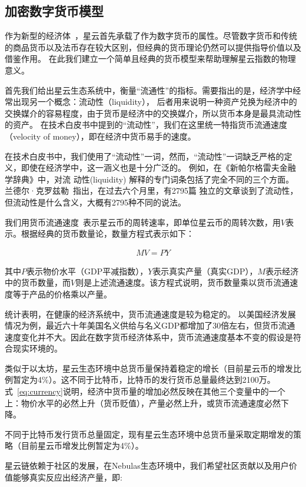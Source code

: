 \subsection{加密数字货币模型}

作为新型的经济体~\cite{neweco}，星云首先承载了作为数字货币的属性。尽管数字货币和传统的商品货币以及法币存在较大区别，但经典的货币理论仍然可以提供指导价值以及借鉴作用。
在此我们建立一个简单且经典的货币模型来帮助理解星云指数的物理意义。

首先我们给出星云生态系统中，衡量“流通性”的指标。需要指出的是，经济学中经常出现另一个概念：流动性（liquidity），
后者用来说明一种资产兑换为经济中的交换媒介的容易程度，由于货币是经济中的交换媒介，所以货币本身是最具流动性的资产。
在技术白皮书中提到的“流动性”，我们在这里统一特指货币流通速度（velocity of money），即在经济中货币易手的速度。

{\color{gray} 在技术白皮书中，我们使用了``流动性''一词，然而，``流动性''一词缺乏严格的定义，即使在经济学中，这一涵义也是十分广泛的。
例如，在《新帕尔格雷夫金融学辞典》中，对流
动性(liquidity) 解释的专门词条包括了完全不同的三个方面。兰德尔·克罗兹勒~\cite{randall}指出，在过去六个月里，有2795篇
独立的文章谈到了流动性，但流动性是什么含义，大概有2795种不同的说法。}


我们用货币流通速度~\cite{selden}表示星云币的周转速率，即单位星云币的周转次数，用$V$表示。根据经典的货币数量论，数量方程式表示如下：

\begin{align}
MV=PY
\label{eq:currency}
\end{align}

其中$P$表示物价水平（GDP平减指数），$Y$表示真实产量（真实GDP），$M$表示经济中的货币数量，而$V$则是上述流通速度。该方程式说明，货币数量乘以货币流通速度等于产品的价格乘以产量。

统计表明，在健康的经济系统中，货币流通速度是较为稳定的。
以美国经济发展情况为例，最近六十年美国名义供给与名义GDP都增加了30倍左右，但货币流通速度变化并不大。因此在数字货币经济体系中，货币流通速度基本不变的假设是符合现实环境的。

类似于以太坊，星云生态环境中总货币量保持着稳定的增长（目前星云币的增发比例暂定为4\%）。这不同于比特币，比特币的发行货币总量最终达到2100万。
式~\ref{eq:currency}说明，经济中货币量的增加必然反映在其他三个变量中的一个上：物价水平的必然上升（货币贬值），产量必然上升，或货币流通速度必然下降。

不同于比特币发行货币总量固定，现有星云生态环境中总货币量采取定期增发的策略（目前星云币增发比例暂定为4\%）。


星云链依赖于社区的发展，在Nebulas生态环境中，我们希望社区贡献以及用户价值能够真实反应出经济产量，即:

